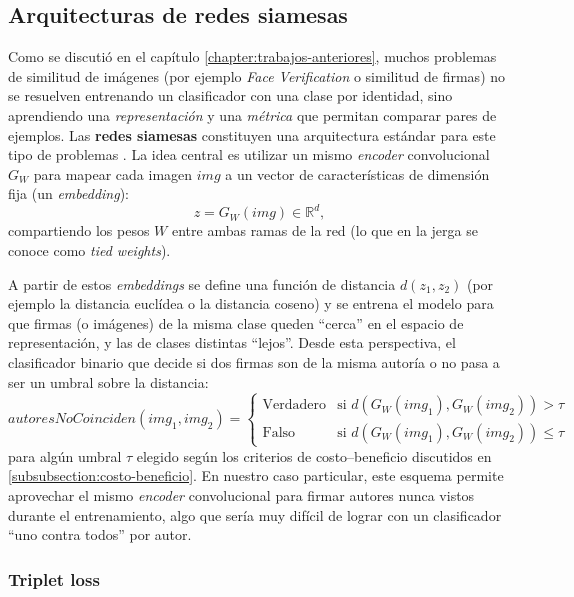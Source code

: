 {\subsection{Arquitecturas de redes siamesas} \label{subsection:siamesas}

Como se discutió en el capítulo \ref{chapter:trabajos-anteriores}, muchos problemas de similitud de imágenes (por ejemplo \textit{Face Verification} o similitud de firmas) no se resuelven entrenando un clasificador con una clase por identidad, sino aprendiendo una \textit{representación} y una \textit{métrica} que permitan comparar pares de ejemplos. Las \textbf{redes siamesas} constituyen una arquitectura estándar para este tipo de problemas \cite{siamess-lecun}. La idea central es utilizar un mismo \textit{encoder} convolucional $G_W$ para mapear cada imagen $img$ a un vector de características de dimensión fija (un \textit{embedding}):
\begin{equation*}
    z = G_W(img) \in \mathbb{R}^d,
\end{equation*}
compartiendo los pesos $W$ entre ambas ramas de la red (lo que en la jerga se conoce como \textit{tied weights}). 

A partir de estos \textit{embeddings} se define una función de distancia $d(z_1, z_2)$ (por ejemplo la distancia euclídea o la distancia coseno) y se entrena el modelo para que firmas (o imágenes) de la misma clase queden “cerca” en el espacio de representación, y las de clases distintas “lejos”. Desde esta perspectiva, el clasificador binario que decide si dos firmas son de la misma autoría o no pasa a ser un umbral sobre la distancia:
\begin{equation*}
    autoresNoCoinciden(img_1, img_2) = 
    \left\{
        \begin{array}{ll}
        \text{Verdadero} & \text{si } d(G_W(img_1), G_W(img_2)) > \tau \\
        \text{Falso}     & \text{si } d(G_W(img_1), G_W(img_2)) \leq \tau
        \end{array}
    \right.
\end{equation*}
para algún umbral $\tau$ elegido según los criterios de costo–beneficio discutidos en \ref{subsubsection:costo-beneficio}. En nuestro caso particular, este esquema permite aprovechar el mismo \textit{encoder} convolucional para firmar autores nunca vistos durante el entrenamiento, algo que sería muy difícil de lograr con un clasificador “uno contra todos” por autor.

\subsubsection{Triplet loss} \label{subsubsection:triplet-loss}

}
